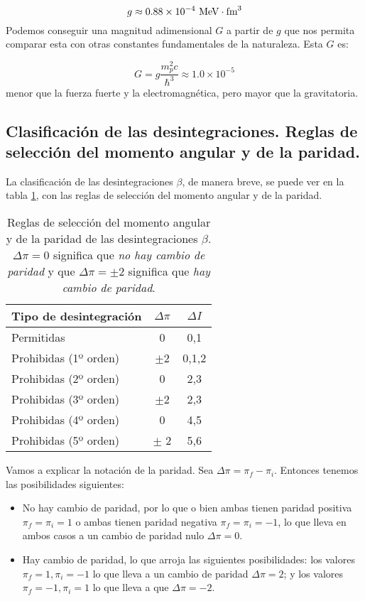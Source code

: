 \begin{equation}
	g\approx 0.88 \times 10^{-4} \ \unit{\MeV\cdot\fm^3}
\end{equation}
Podemos conseguir una magnitud adimensional $G$ a partir de $g$ que nos permita comparar esta con otras constantes fundamentales de la naturaleza. Esta $G$ es:

\begin{equation}
	G= g \frac{m_p ^2 c}{\hbar^3} \approx 1.0 \times 10^{-5}
\end{equation}
menor que la fuerza fuerte y la electromagnética, pero mayor que la gravitatoria. 

\subsection[Clasificación de las desintegraciones $\beta$]{Clasificación de las desintegraciones. Reglas de selección del momento angular y de la paridad.}

La clasificación de las desintegraciones $\beta$, de manera breve, se puede ver en la tabla \ref{Tab:02-02-01}, con las reglas de selección del momento angular y de la paridad.

\begin{table}[h!]\centering
	\begin{tabular}{|l||c|c|}\hline
		Tipo de desintegración & $\Delta \pi$ & $\Delta I$ \\ \hline \hline
		Permitidas & 0 & 0,1 \\ \hline 
		Prohibidas (1º orden) & $\pm$2 & 0,1,2 \\ \hline
		Prohibidas (2º orden) & 0 & 2,3 \\ 	\hline	
		Prohibidas (3º orden) & $\pm$2 & 2,3 \\ \hline	
		Prohibidas (4º orden) & 0 & 4,5 \\ 	\hline	
		Prohibidas (5º orden) & $\pm$ 2 & 5,6  \\		 \hline
	\end{tabular}
	\caption{Reglas de selección del momento angular y de la paridad de las desintegraciones $\beta$. $\Delta \pi=0$ significa que \textit{no hay cambio de paridad} y que $\Delta \pi=\pm2$ significa que \textit{hay cambio de paridad}.}
	\label{Tab:02-02-01}
\end{table}

Vamos a explicar la notación de la paridad. Sea $\Delta \pi = \pi_f - \pi_i$. Entonces tenemos las posibilidades siguientes:

\begin{itemize}
	\item No hay cambio de paridad, por lo que o bien ambas tienen paridad positiva $\pi_f=\pi_i=1$ o ambas tienen paridad negativa  $\pi_f=\pi_i=-1$, lo que lleva en ambos casos a un cambio de paridad nulo $\Delta \pi = 0$.
	\item Hay cambio de paridad, lo que arroja las siguientes posibilidades: los valores $\pi_f=1,\pi_i=-1$ lo que lleva a un cambio de paridad $\Delta \pi=2$; y los valores $\pi_f=-1,\pi_i=1$ lo que lleva a que $\Delta \pi=-2$. 
\end{itemize}


